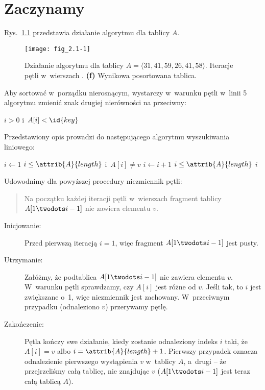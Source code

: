 \chapter{Zaczynamy}


\exercise %
Rys.\ \ref{fig:2.1-1} przedstawia działanie algorytmu  dla tablicy $A$.
\begin{figure}[ht]
	\begin{center}
		\texttt{[image: fig\_2.1-1]}
	\end{center}
	\caption{Działanie algorytmu  dla tablicy $A=\langle31,41,59,26,41,58\rangle$.
{\sffamily\bfseries{}} Iteracje pętli  w~wierszach .
{\sffamily\bfseries(f)} Wynikowa posortowana tablica.} \label{fig:2.1-1}
\end{figure}

\exercise %
Aby sortować w~porządku nierosnącym, wystarczy w~warunku pętli  w~linii 5 algorytmu  zmienić znak drugiej nierówności na przeciwny:
\begin{codebox}
\setcounter{codelinenumber}{4}
\li	\While $i>0$ i~$A[i]<\id{key}$
\end{codebox}

\exercise %
Przedstawiony opis prowadzi do następującego algorytmu wyszukiwania liniowego:
\begin{codebox}
\li	$i\gets1$
\li	\While $i\le\attrib{A}{length}$ i~$A[i]\ne v$ \label{li:linear-search-while-begin}
\li		\Do $i\gets i+1$
		\End \label{li:linear-search-while-end}
\li	\If $i\le\attrib{A}{length}$
\li		\Then \Return $i$
		\End
\li	\Return {}
\end{codebox}

Udowodnimy dla powyższej procedury niezmiennik pętli:
\begin{quote}
Na początku każdej iteracji pętli  w~wierszach \doubledash{\ref{li:linear-search-while-begin}}{\ref{li:linear-search-while-end}} fragment tablicy $A[1\twodots i-1]$ nie zawiera elementu $v$.
\end{quote}
\begin{description}
	\item[Inicjowanie:] Przed pierwszą iteracją $i=1$, więc fragment $A[1\twodots i-1]$ jest pusty.
	\item[Utrzymanie:] Załóżmy, że podtablica $A[1\twodots i-1]$ nie zawiera elementu $v$.
W~warunku pętli  sprawdzamy, czy $A[i]$ jest różne od $v$.
Jeśli tak, to $i$ jest zwiększane o~1, więc niezmiennik jest zachowany.
W~przeciwnym przypadku (odnaleziono $v$) przerywamy pętlę.
	\item[Zakończenie:] Pętla kończy swe działanie, kiedy zostanie odnaleziony indeks $i$ taki, że $A[i]=v$ albo $i=\attrib{A}{length}+1$.
Pierwszy przypadek oznacza odnalezienie pierwszego wystąpienia $v$ w~tablicy $A$, a~drugi -- że przejrzeliśmy całą tablicę, nie znajdując $v$ ($A[1\twodots i-1]$ jest teraz całą tablicą $A$).
\end{description}

